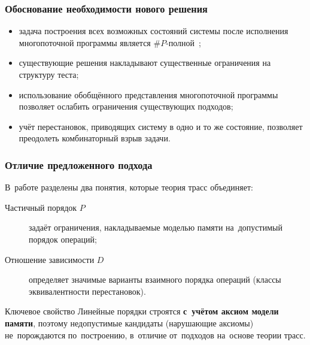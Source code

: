 \begin{frame}
  \frametitle{Обоснование необходимости нового решения}
  \begin{itemize}
    \item задача построения всех возможных состояний системы после
      исполнения многопоточной программы является
      $\#P$-полной~\cite{linextcount};
    \item существующие решения накладывают существенные ограничения
      на структуру теста;
    \item
      использование обобщённого представления
      многопоточной программы позволяет ослабить ограничения существующих
      подходов;
    \item
      учёт перестановок, приводящих
      систему в одно и то же состояние, позволяет преодолеть
      комбинаторный взрыв задачи.
  \end{itemize}


\end{frame}

\begin{frame}
  \frametitle{Отличие предложенного подхода}
  В~работе разделены два понятия, которые теория трасс объединяет:
  \begin{description}
    \item[Частичный порядок $P$] задаёт ограничения, накладываемые
      моделью памяти на~допустимый порядок операций;
    \item[Отношение зависимости $D$] определяет значимые варианты
      взаимного порядка операций (классы эквивалентности перестановок).
  \end{description}
  \begin{block}{Ключевое свойство}
    Линейные порядки строятся \textbf{с~учётом аксиом модели памяти},
    поэтому недопустимые кандидаты (нарушающие аксиомы) не~порождаются
    по~построению, в~отличие от~подходов на~основе теории трасс.
  \end{block}
\end{frame}


